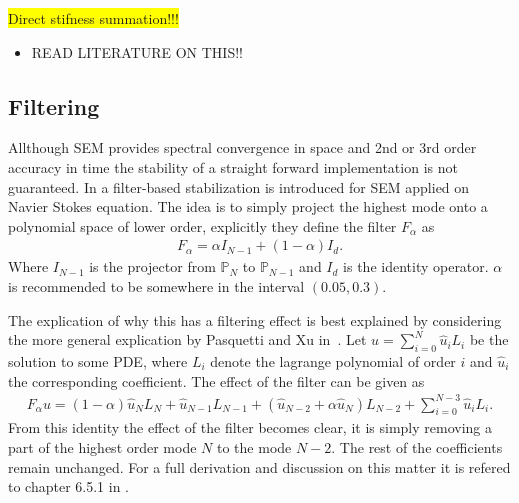 \colorbox{yellow}{Direct stifness summation!!!}


\begin{itemize}
\item READ LITERATURE ON THIS!! 
\end{itemize}

\subsection{Filtering}
Allthough SEM provides spectral convergence in space and 2nd or 3rd order accuracy in time the stability of a straight forward
implementation is not guaranteed. In \cite{FischerMullen} a filter-based stabilization is introduced for SEM applied on 
Navier Stokes equation. The idea is to simply project the highest mode onto a polynomial space of lower order, 
explicitly they define the filter $F_{\alpha}$ as 
%
\begin{align}
    F_{\alpha}= \alpha I_{N-1}  + (1-\alpha) I_d.
    \label{eq:filter}
\end{align}
%
Where $I_{N-1}$ is the projector from $\mathbb{P}_N$ to $\mathbb{P}_{N-1}$ and $ I_d$ is the identity operator.
$\alpha$ is recommended to be somewhere in the interval $(0.05,0.3)$.

The explication of why this has a filtering effect is best explained by considering the 
more general explication by Pasquetti and Xu in~\cite{Pasquetti}. 
Let $u = \sum_{i=0}^{N} \hat{u}_i L_i$ be the solution to some PDE, where $L_i$ denote the lagrange
polynomial of order $i$ and $\hat{u}_i$ the corresponding coefficient. The effect of the filter
can be given as 
%
\begin{align}
    F_{\alpha} u = 
    (1-\alpha)\hat{u}_{N}L_{N}
    +\hat{u}_{N-1}L_{N-1} +
    (\hat{u}_{N-2}+\alpha \hat{u}_{N})L_{N-2}
    +\sum_{i=0}^{N-3}\hat{u}_{i}L_{i}.
    \label{eq:filtereffect}
\end{align}
%
From this identity the effect of the filter becomes clear, it is simply removing a part of 
the highest order mode $N$ to the mode $N-2$. The rest of the coefficients remain unchanged.
For a full derivation and discussion on this matter it is refered to chapter 6.5.1 in 
\cite{Karniadakis}.

